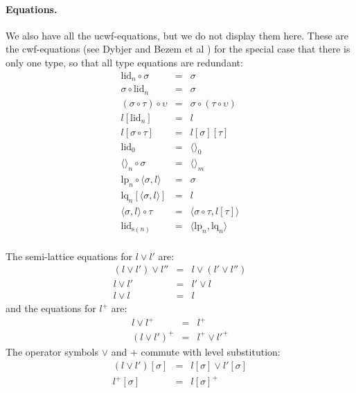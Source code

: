 \documentclass[11pt,a4paper]{article}
\theoremstyle{definition}
\newcommand{\id}{\mathsf{id}}
\def\Hom{\mathrm{hom}}
\def\id{\mathrm{id}}
\def\lctx{\mathrm{lctx}}
\def\lp{\mathrm{lp}}
\def\lq{\mathrm{lq}}
\def\s{\mathrm{s}}
\def\lid{\mathrm{lid}}
\newcommand{\ctx}{\mathrm{ctx}}
\newcommand{\ty}{\mathrm{ty}}
\newcommand{\tm}{\mathrm{tm}}
\newcommand{\tuple}[1]{\langle #1 \rangle}
\begin{document}
\paragraph{Equations.} 
We also have all the ucwf-equations, but we do not display them here. These are the cwf-equations (see Dybjer \cite{dybjer:torino} and Bezem et al \cite{BezemCDE22})
for the special case that there is only one type, so that all type equations are redundant:
\begin{eqnarray*}
\lid_{n} \circ \sigma &=& \sigma \\
 \sigma \circ \lid_{n} &=& \sigma \\
(\sigma \circ \tau) \circ \upsilon &=& \sigma \circ (\tau \circ \upsilon)\\
l[\lid_{n}] &=& l \\
l[\sigma\circ\tau] &=& l[\sigma][\tau]\\
\lid_{0} &=& \tuple{}_{0}\\
\tuple{}_{n}\circ\sigma &=& \tuple{}_{m}\\
\lp_n \circ \tuple{\sigma,l} &=& \sigma\\
\lq_n [\tuple{\sigma,l}] &=& l\\
\tuple{\sigma,l} \circ \tau &=& \tuple{\sigma \circ \tau,l[\tau]}\\
\lid_{\s(n)} &=& \tuple{\lp_n,\lq_n}\\
\end{eqnarray*}



The semi-lattice equations for $l \vee l'$ are:
\begin{eqnarray*}
(l \vee l') \vee l'' &=& l \vee (l' \vee l'')\\
l \vee l' &=& l'\vee l\\
l \vee l &=& l
\end{eqnarray*}
and the equations for $l^+$ are:
\begin{eqnarray*}
l \vee l^+ &=& l^+\\
(l\vee l')^+ &=& l^+\vee l'^+
\end{eqnarray*}
The operator symbols $\vee$ and $+$ commute with level substitution:
\begin{eqnarray*}
(l \vee l')[\sigma] &=& l[\sigma] \vee l' [\sigma]\\
 l^+[\sigma] &=&  l[\sigma]^+
\end{eqnarray*}
\end{document}
